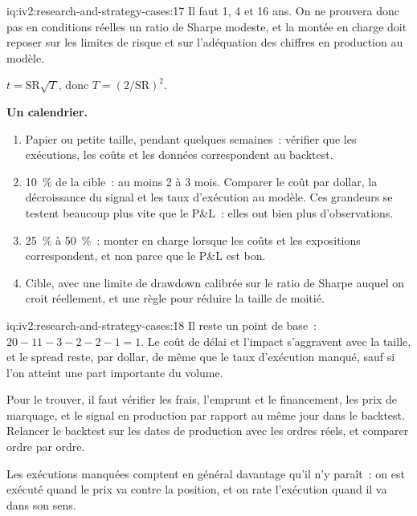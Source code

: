 \begin{solution}{iq:iv2:research-and-strategy-cases:17}
Il faut 1, 4 et 16 ans. On ne prouvera donc pas en conditions réelles un ratio de Sharpe modeste, et la montée en charge doit reposer sur les limites de risque et sur l'adéquation des chiffres en production au modèle.

$t = \mathrm{SR}\sqrt{T}$, donc $T = (2/\mathrm{SR})^2$.

\textbf{Un calendrier.}
\begin{enumerate}
\item Papier ou petite taille, pendant quelques semaines~: vérifier que les exécutions, les coûts et les données correspondent au backtest.
\item 10~\% de la cible~: au moins 2 à 3 mois. Comparer le coût par dollar, la décroissance du signal et les taux d'exécution au modèle. Ces grandeurs se testent beaucoup plus vite que le P\&L~: elles ont bien plus d'observations.
\item 25~\% à 50~\%~: monter en charge lorsque les coûts et les expositions correspondent, et non parce que le P\&L est bon.
\item Cible, avec une limite de drawdown calibrée sur le ratio de Sharpe auquel on croit réellement, et une règle pour réduire la taille de moitié.
\end{enumerate}

\end{solution}

\begin{solution}{iq:iv2:research-and-strategy-cases:18}
Il reste un point de base~: $20 - 11 - 3 - 2 - 2 - 1 = 1$. Le coût de délai et l'impact s'aggravent avec la taille, et le spread reste, par dollar, de même que le taux d'exécution manqué, sauf si l'on atteint une part importante du volume.

Pour le trouver, il faut vérifier les frais, l'emprunt et le financement, les prix de marquage, et le signal en production par rapport au même jour dans le backtest. Relancer le backtest sur les dates de production avec les ordres réels, et comparer ordre par ordre.

Les exécutions manquées comptent en général davantage qu'il n'y paraît~: on est exécuté quand le prix va contre la position, et on rate l'exécution quand il va dans son sens.

\end{solution}

